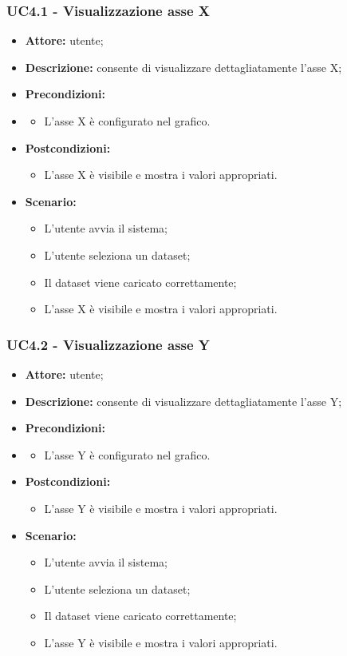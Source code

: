 \subsubsection{UC4.1 - Visualizzazione asse X}
\begin{itemize}
    \item \textbf{Attore:} utente;
    \item \textbf{Descrizione:} consente di visualizzare dettagliatamente l'asse X;
    \item \textbf{Precondizioni:} 
    \item \begin{itemize}
        \item L'asse X è configurato nel grafico.
    \end{itemize}
    \item \textbf{Postcondizioni:} 
    \begin{itemize}
        \item L'asse X è visibile e mostra i valori appropriati.
    \end{itemize}
    \item \textbf{Scenario:} 
    \begin{itemize}
        \item L'utente avvia il sistema;
        \item L'utente seleziona un dataset;
        \item Il dataset viene caricato correttamente;
        \item L'asse X è visibile e mostra i valori appropriati.
    \end{itemize}
\end{itemize}
\subsubsection{UC4.2 - Visualizzazione asse Y}
\begin{itemize}
    \item \textbf{Attore:} utente;
    \item \textbf{Descrizione:} consente di visualizzare dettagliatamente l'asse Y;
    \item \textbf{Precondizioni:} 
    \item \begin{itemize}
        \item L'asse Y è configurato nel grafico.
    \end{itemize}
    \item \textbf{Postcondizioni:} 
    \begin{itemize}
        \item L'asse Y è visibile e mostra i valori appropriati.
    \end{itemize}
    \item \textbf{Scenario:} 
    \begin{itemize}
        \item L'utente avvia il sistema;
        \item L'utente seleziona un dataset;
        \item Il dataset viene caricato correttamente;
        \item L'asse Y è visibile e mostra i valori appropriati.
    \end{itemize}
\end{itemize}
